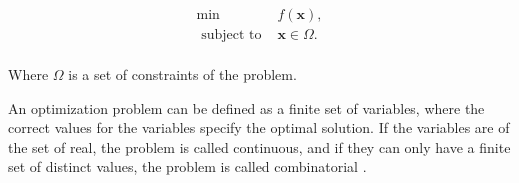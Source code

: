\documentclass[conference,harvard,brazil,english]{sbatex}
\begin{document}
\begin{equation}
	\label{eq:optproblema}
	\begin{array}{cc}
		\min & f(\textbf{x}),  \\
		\textrm{ subject to } & \textbf{x}\in\Omega.\\
	\end{array}
\end{equation}	

Where $\Omega$ is a set of constraints of the problem.
	
An optimization problem can be defined as a finite set of variables, where the correct values for the variables specify the optimal solution. If the variables are of the set of real, the problem is called continuous, and if they can only have a finite set of distinct values, the problem is called combinatorial \protect\cite{francq2011optimization}.
\end{document}
